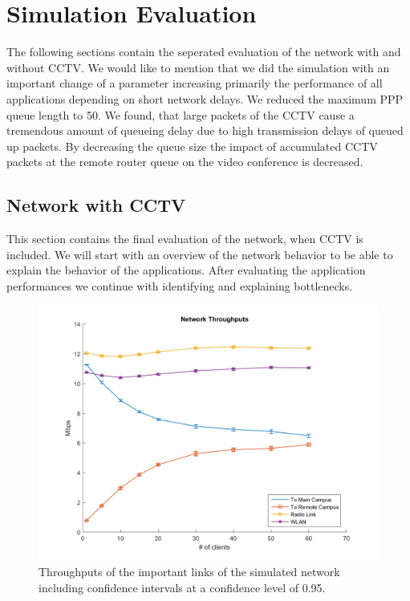 \documentclass[
10pt, %
a4paper, %
oneside, %
headinclude,footinclude, %
BCOR5mm, %
]{scrartcl}
\begin{document}
\section{Simulation Evaluation}
The following sections contain the seperated evaluation of the network with and without CCTV.
We would like to mention that we did the simulation with an important change of a parameter increasing primarily the performance of all applications depending on short network delays. We reduced the maximum PPP queue length to 50. We found, that large packets of the CCTV cause a tremendous amount of queueing delay due to high transmission delays of queued up packets. By decreasing the queue size the impact of accumulated CCTV packets at the remote router queue on the video conference is decreased.

\subsection{Network with CCTV}
This section contains the final evaluation of the network, when CCTV is included. We will start with an overview of the network behavior to be able to explain the behavior of the applications. After evaluating the application performances we continue with identifying and explaining bottlenecks.
\begin{figure}[!ht]
  \centering
  \includegraphics[width=\textwidth]{Figures/cctv/Network_Throughputs.png}
  \caption{Throughputs of the important links of the simulated network including confidence intervals at a confidence level of 0.95.} \label{fig:cctv_network_throughputs}
\end{figure}
\end{document}
